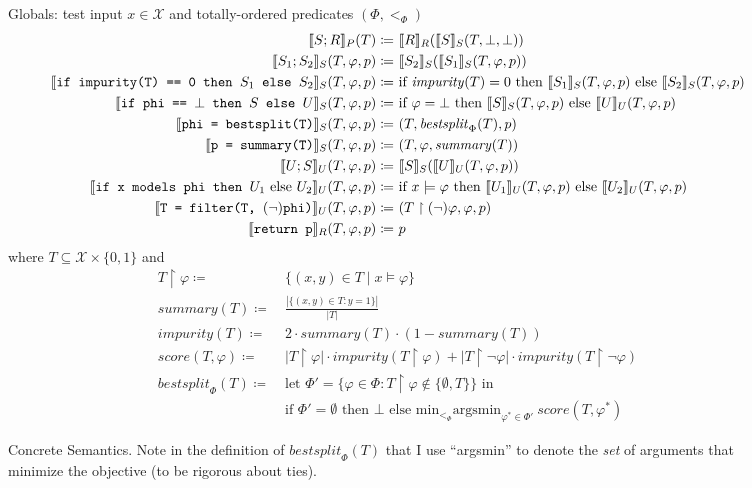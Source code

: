 \begin{figure}
\centering
Globals: test input $x \in \mathcal{X}$ and totally-ordered predicates $(\Phi, <_\Phi)$
\begin{align*}
\den[P]{S ; R}(T) \coloneqq&~
\den[R]{R}(\den[S]{S}(T, \bot, \bot)) \\
%
\den[S]{S_1 ; S_2}(T, \varphi, p) \coloneqq&~
\den[S]{S_2}(\den[S]{S_1}(T, \varphi, p)) \\
%
\den[S]{\iteimpuritynode{S_1}{S_2}}(T, \varphi, p) \coloneqq&~
\text{if } \mathit{impurity}(T) = 0 \text{ then } \den[S]{S_1}(T, \varphi, p)
\text{ else } \den[S]{S_2}(T, \varphi, p) \\
%
\den[S]{\itetrivialnode{S}{U}}(T, \varphi, p) \coloneqq&~
\text{if } \varphi = \bot \text{ then } \den[S]{S}(T, \varphi, p)
\text{ else } \den[U]{U}(T, \varphi, p) \\
%
\den[S]{\bestsplitnode}(T, \varphi, p) \coloneqq&~
(T, \mathit{bestsplit}_\Phi(T), p) \\
%
\den[S]{\summarynode}(T, \varphi, p) \coloneqq&~
(T, \varphi, \mathit{summary}(T)) \\
%
\den[U]{U ; S}(T, \varphi, p) \coloneqq&~
\den[S]{S}(\den[U]{U}(T, \varphi, p)) \\
%
\den[U]{\itemodelsnode{U_1}{U_2}}(T, \varphi, p) \coloneqq&~
\text{if } x \models \varphi \text{ then } \den[U]{U_1}(T, \varphi, p)
\text{ else } \den[U]{U_2}(T, \varphi, p) \\
%
\den[U]{\filternode[(\lnot)]}(T, \varphi, p) \coloneqq&~
(T \upharpoonright (\lnot)\varphi, \varphi, p) \\
%
\den[R]{\returnnode}(T, \varphi, p) \coloneqq&~ p
\end{align*}
where $T \subseteq \mathcal{X} \times \{0,1\}$ and
\begin{align*}
T \upharpoonright \varphi \coloneqq&~ \{(x,y) \in T \mid x \models \varphi\} \\
\mathit{summary}(T) \coloneqq&~ \frac{|\{(x,y) \in T : y = 1\}|}{|T|} \\
\mathit{impurity}(T) \coloneqq&~ 2 \cdot \mathit{summary}(T) \cdot (1-\mathit{summary}(T)) \\
\mathit{score}(T, \varphi) \coloneqq&~
|T \upharpoonright \varphi| \cdot \mathit{impurity}(T \upharpoonright \varphi) +
|T \upharpoonright \lnot\varphi| \cdot \mathit{impurity}(T \upharpoonright \lnot\varphi) \\
\mathit{bestsplit}_\Phi(T) \coloneqq&~
\text{let } \Phi' = \{\varphi \in \Phi : T \upharpoonright \varphi \not\in \{\emptyset, T\}\} \text{ in } \\
&~\text{if } \Phi' = \emptyset \text{ then } \bot \text{ else }
\text{min}_{<_\Phi} \text{argsmin}_{\varphi^* \in \Phi'}~\mathit{score}(T, \varphi^*)
\end{align*}
\caption{Concrete Semantics.
Note in the definition of $\mathit{bestsplit}_\Phi(T)$
that I use ``argsmin'' to denote the \emph{set} of arguments
that minimize the objective (to be rigorous about ties).}
\label{fig:concrete}
\end{figure}

